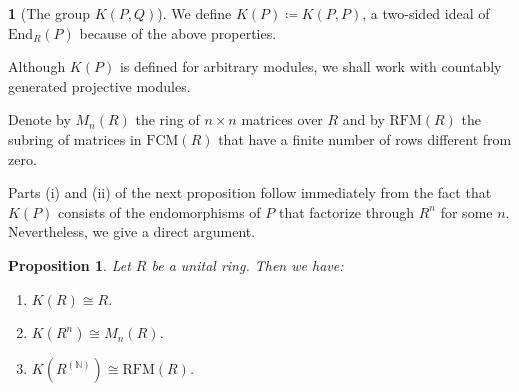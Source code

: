 \documentclass[11pt]{amsart}
\numberwithin{equation}{section}
\newtheorem{prp}[prpCt]{Proposition}
\theoremstyle{definition}
\newtheorem{pgr}[pgrCt]{}
\theoremstyle{plain}
\theoremstyle{definition}
\begin{document}
\begin{pgr}[The group $K(P, Q)$]
We define $K(P) \coloneqq K(P,P)$, a two-sided ideal of $\mathrm{End}_R(P)$ because of the above properties. 

Although $K(P)$ is defined for arbitrary modules, we shall work with countably generated projective modules.
\end{pgr}

Denote by $M_n(R)$ the ring of $n \times n$ matrices over $R$ and by $\mathrm{RFM}(R)$ the subring of matrices in $\mathrm{FCM}(R)$ that have a finite number of rows different from zero. 

Parts (i) and (ii) of the next proposition follow immediately from the fact that $K(P)$ consists of the endomorphisms of $P$ that factorize through $R^n$ for some $n$. Nevertheless, we give a direct argument. 

\begin{prp} \label{k(r^n)}
Let $R$ be a unital ring. Then we have:
\begin{enumerate}[label=\rm{(\roman*)}]
\item $K(R) \cong R$. 
\item $K(R^n) \cong M_n(R)$.
\item $K(R^{(\mathbb{N})}) \cong \mathrm{RFM}(R)$.
\end{enumerate}
\end{prp}
\end{document}
